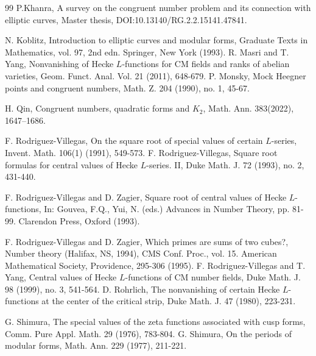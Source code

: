 \documentclass[11pt, reqno]{amsart}
\theoremstyle{plain}
\theoremstyle{definition}
\numberwithin{equation}{section}
\begin{document}
\begin{thebibliography}{99}
 P.Khanra, A survey on the congruent number problem and its connection with elliptic curves, Master thesis, DOI:10.13140/RG.2.2.15141.47841.


   N. Koblitz, Introduction to elliptic curves and modular forms,  Graduate Texts in Mathematics, vol.
97, 2nd edn. Springer, New York (1993).
 R.  Masri and T. Yang, Nonvanishing of Hecke $L$-functions for CM fields and ranks of abelian varieties, Geom. Funct. Anal. Vol. 21 (2011), 648-679. 
     P. Monsky, Mock Heegner points and congruent numbers, Math. Z. 204 (1990), no. 1,
45-67.

 H. Qin, Congruent numbers, quadratic forms and {$K_2$}, Math. Ann. 383(2022), 1647--1686.

 F. Rodriguez-Villegas, On the square root of special values of certain $L$-series, Invent. Math. 106(1)  (1991), 549-573.
 F. Rodriguez-Villegas, Square root formulas for central values of Hecke $L$-series. II, 
Duke Math. J. 72 (1993), no. 2, 431-440.

 F. Rodriguez-Villegas and D. Zagier, Square root of central values of Hecke $L$-functions, In: Gouvea, F.Q., Yui, N. (eds.) Advances in Number Theory, pp. 81-99. Clarendon Press, Oxford (1993).

  F. Rodriguez-Villegas and D. Zagier, Which primes are sums of two cubes?, Number theory (Halifax, NS, 1994), CMS Conf. Proc., vol. 15. American Mathematical Society, Providence, 295-306 (1995).
  F. Rodriguez-Villegas and T. Yang, 
 Central values of Hecke $L$-functions of CM number fields, 
Duke Math. J. 98 (1999), no. 3, 541-564.
 D. Rohrlich, The nonvanishing of certain Hecke $L$-functions at the center of the critical strip,
Duke Math. J. 47 (1980), 223-231.



G. Shimura, The special values of the zeta functions associated with cusp forms, Comm. Pure
Appl. Math. 29 (1976), 783-804.
 G. Shimura,  On the periods of modular forms, Math. Ann. 229 (1977), 211-221.


\end{thebibliography}
\end{document}
